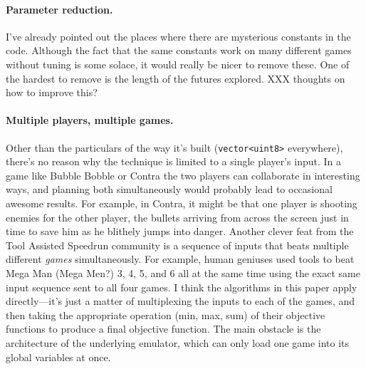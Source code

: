 \documentclass[twocolumn]{article}
\begin{document}
\paragraph{Parameter reduction.} I've already pointed out the places
where there are mysterious constants in the code. Although the fact
that the same constants work on many different games without tuning
is some solace, it would really be nicer to remove these. One of the
hardest to remove is the length of the futures explored. XXX thoughts
on how to improve this?

\paragraph{Multiple players, multiple games.} Other than the particulars
of the way it's built (\verb+vector<uint8>+ everywhere), there's no
reason why the technique is limited to a single player's input. In a
game like Bubble Bobble or Contra the two players can collaborate in
interesting ways, and planning both simultaneously would probably lead
to occasional awesome results. For example, in Contra, it might be
that one player is shooting enemies for the other player, the bullets
arriving from across the screen just in time to save him as he
blithely jumps into danger. Another clever feat from the Tool Assisted
Speedrun community is a sequence of inputs that beats multiple
different {\em games} simultaneously. For example, human geniuses used
tools to beat Mega Man (Mega Men?) 3, 4, 5, and 6 all at the same time
using the exact same input sequence sent to all four
games.\cite{BaxterTAS} I think the algorithms in this paper apply
directly---it's just a matter of multiplexing the inputs to each of
the games, and then taking the appropriate operation (min, max, sum) of
their objective functions to produce a final objective function. The
main obstacle is the architecture of the underlying emulator, which
can only load one game into its global variables at once.





\end{document}
